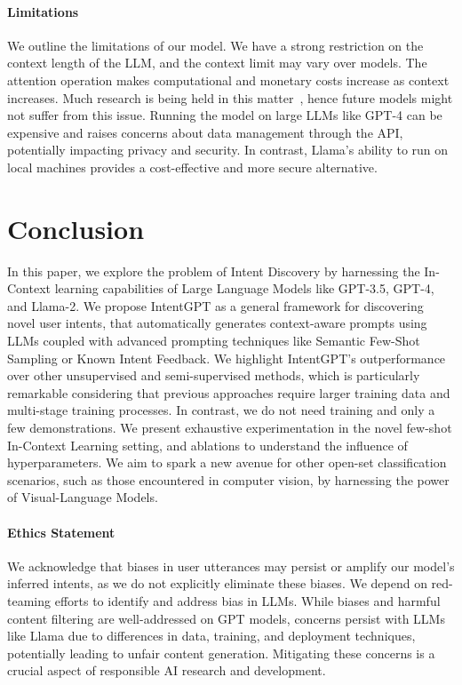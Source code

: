 \documentclass[11pt]{article}
\begin{document}
\paragraph{Limitations} \label{limitations}
We outline the limitations of our model. We have a strong restriction on the context length of the LLM, and the context limit may vary over models. The attention operation makes computational and monetary costs increase as context increases. Much research is being held in this matter~\cite{bulatov2023scaling, dao2022flashattention}, hence future models might not suffer from this issue. Running the model on large LLMs like GPT-4 can be expensive and raises concerns about data management through the API, potentially impacting privacy and security. In contrast, Llama's ability to run on local machines provides a cost-effective and more secure alternative.

\section{Conclusion}\label{conclusion}
In this paper, we explore the problem of Intent Discovery by harnessing the In-Context learning capabilities of Large Language Models like GPT-3.5, GPT-4, and Llama-2. We propose IntentGPT as a general framework for discovering novel user intents, that automatically generates context-aware prompts using LLMs coupled with advanced prompting techniques like Semantic Few-Shot Sampling or Known Intent Feedback. We highlight IntentGPT's outperformance over other unsupervised and semi-supervised methods, which is particularly remarkable considering that previous approaches require larger training data and multi-stage training processes. In contrast, we do not need training and only a few demonstrations. We present exhaustive experimentation in the novel few-shot In-Context Learning setting, and ablations to understand the influence of hyperparameters. We aim to spark a new avenue for other open-set classification scenarios, such as those encountered in computer vision, by harnessing the power of Visual-Language Models.

\paragraph{Ethics Statement}\label{ethics}
We acknowledge that biases in user utterances may persist or amplify our model's inferred intents, as we do not explicitly eliminate these biases. We depend on red-teaming efforts to identify and address bias in LLMs. While biases and harmful content filtering are well-addressed on GPT models, concerns persist with LLMs like Llama due to differences in data, training, and deployment techniques, potentially leading to unfair content generation. Mitigating these concerns is a crucial aspect of responsible AI research and development.
\end{document}
